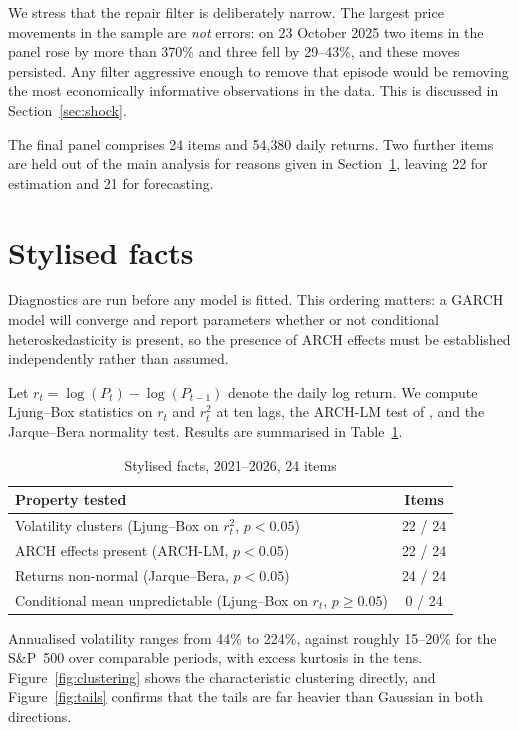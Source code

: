 \documentclass[11pt,a4paper]{article}
\begin{document}
We stress that the repair filter is deliberately narrow. The largest price
movements in the sample are \emph{not} errors: on 23 October 2025 two items in
the panel rose by more than 370\% and three fell by 29--43\%, and these moves
persisted. Any filter aggressive enough to remove that episode would be
removing the most economically informative observations in the data. This is
discussed in Section~\ref{sec:shock}.

The final panel comprises 24 items and 54{,}380 daily returns. Two further
items are held out of the main analysis for reasons given in
Section~\ref{sec:facts}, leaving 22 for estimation and 21 for forecasting.

\section{Stylised facts}\label{sec:facts}

Diagnostics are run before any model is fitted. This ordering matters: a GARCH
model will converge and report parameters whether or not conditional
heteroskedasticity is present, so the presence of ARCH effects must be
established independently rather than assumed.

Let $r_t = \log(P_t) - \log(P_{t-1})$ denote the daily log return. We compute
Ljung--Box statistics on $r_t$ and $r_t^2$ at ten lags, the ARCH-LM test of
\citet{Engle1982}, and the Jarque--Bera normality test. Results are summarised
in Table~\ref{tab:facts}.

\begin{table}[htbp]
\centering
\caption{Stylised facts, 2021--2026, 24 items}
\label{tab:facts}
\begin{tabular}{lc}
\toprule
Property tested & Items \\
\midrule
Volatility clusters (Ljung--Box on $r_t^2$, $p<0.05$) & 22 / 24 \\
ARCH effects present (ARCH-LM, $p<0.05$)             & 22 / 24 \\
Returns non-normal (Jarque--Bera, $p<0.05$)          & 24 / 24 \\
Conditional mean unpredictable (Ljung--Box on $r_t$, $p\geq0.05$) & 0 / 24 \\
\bottomrule
\end{tabular}
\end{table}

Annualised volatility ranges from 44\% to 224\%, against roughly 15--20\% for
the S\&P~500 over comparable periods, with excess kurtosis in the tens.
Figure~\ref{fig:clustering} shows the characteristic clustering directly, and
Figure~\ref{fig:tails} confirms that the tails are far heavier than Gaussian
in both directions.
\end{document}
